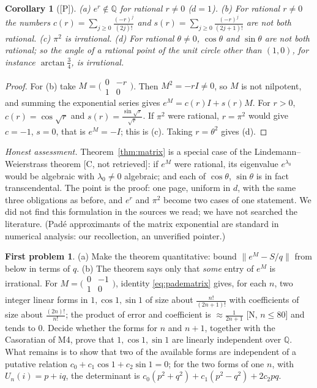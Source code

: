 \documentclass[11pt,a4paper]{article}
\newcommand{\Q}{\mathbb Q}
\newcommand{\st}[1]{\textsf{[#1]}}
\newtheorem{corollary}[theorem]{Corollary}
\theoremstyle{definition}
\newtheorem*{problem}{First problem}
\begin{document}
\begin{corollary}[\st{P}]\label{cor:matrix}
\textup{(a)} $e^r\notin\Q$ for rational $r\ne0$ \textup{(}$d=1$\textup{)}.
\textup{(b)} For rational $r\ne0$ the numbers $c(r)=\sum_{j\ge0}\frac{(-r)^j}{(2j)!}$ and
$s(r)=\sum_{j\ge0}\frac{(-r)^j}{(2j+1)!}$ are not both rational.
\textup{(c)} $\pi^2$ is irrational.
\textup{(d)} For rational $\theta\ne0$, $\cos\theta$ and $\sin\theta$ are not both rational; so the
angle of a rational point of the unit circle other than $(1,0)$, for instance $\arctan\frac34$, is
irrational.
\end{corollary}
\begin{proof}
For (b) take $M=\bigl(\begin{smallmatrix}0&-r\\1&0\end{smallmatrix}\bigr)$. Then $M^2=-rI\neq0$, so $M$
is not nilpotent, and summing the exponential series gives $e^M=c(r)I+s(r)M$. For $r>0$,
$c(r)=\cos\sqrt r$ and $s(r)=\frac{\sin\sqrt r}{\sqrt r}$. If $\pi^2$ were rational, $r=\pi^2$ would
give $c=-1$, $s=0$, that is $e^M=-I$; this is (c). Taking $r=\theta^2$ gives (d).
\end{proof}

\emph{Honest assessment.} Theorem~\ref{thm:matrix} is a special case of the Lindemann--Weierstrass
theorem \st{C, not retrieved}: if $e^M$ were rational, its eigenvalue $e^{\lambda_0}$ would be
algebraic with $\lambda_0\neq0$ algebraic; and each of $\cos\theta$, $\sin\theta$ is in fact
transcendental. The point is the proof: one page, uniform in $d$, with the same three obligations
as before, and $e^r$ and $\pi^2$ become two cases of one statement. We did not find this formulation
in the sources we read; we have not searched the literature. (Pad\'e approximants of the matrix
exponential are standard in numerical analysis: our recollection, an unverified pointer.)

\begin{problem}
(a) Make the theorem quantitative: bound $\|e^M-S/q\|$ from below in terms of $q$.
(b) The theorem says only that \emph{some} entry of $e^M$ is irrational. For
$M=\bigl(\begin{smallmatrix}0&-1\\1&0\end{smallmatrix}\bigr)$, identity \eqref{eq:padematrix} gives,
for each $n$, two integer linear forms in $1,\cos1,\sin1$ of size about $\frac{n!}{(2n+1)!}$ with
coefficients of size about $\frac{(2n)!}{n!}$; the product of error and coefficient is
$\approx\frac1{2n+1}$ \st{N, $n\le80$} and tends to $0$. Decide whether the forms for $n$ and $n+1$,
together with the Casoratian of M4, prove that $1,\cos1,\sin1$ are linearly independent over $\Q$.
What remains is to show that two of the available forms are independent of a putative relation
$c_0+c_1\cos1+c_2\sin1=0$; for the two forms of one $n$, with $U_n(i)=p+iq$, the determinant is
$c_0(p^2+q^2)+c_1(p^2-q^2)+2c_2pq$.
\end{problem}
\end{document}
